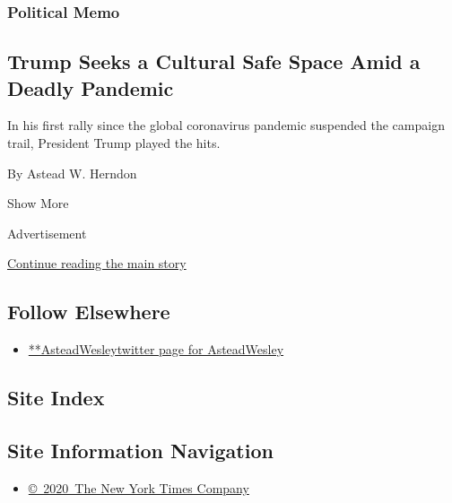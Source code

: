 \begin{enumerate}
  \hypertarget{political-memo}{%
  \subsubsection{Political Memo}\label{political-memo}}

  \hypertarget{trump-seeks-a-cultural-safe-space-amid-a-deadly-pandemic}{%
  \subsection{Trump Seeks a Cultural Safe Space Amid a Deadly
  Pandemic}\label{trump-seeks-a-cultural-safe-space-amid-a-deadly-pandemic}}

  In his first rally since the global coronavirus pandemic suspended the
  campaign trail, President Trump played the hits.

  By Astead W. Herndon
\end{enumerate}

Show More

Advertisement

\protect\hyperlink{after-mid2}{Continue reading the main story}

\hypertarget{follow-elsewhere}{%
\subsection{Follow Elsewhere}\label{follow-elsewhere}}

\begin{itemize}
\tightlist
\item
  \href{https://twitter.com/AsteadWesley}{**AsteadWesleytwitter page for
  AsteadWesley}
\end{itemize}

\hypertarget{site-index}{%
\subsection{Site Index}\label{site-index}}

\hypertarget{site-information-navigation}{%
\subsection{Site Information
Navigation}\label{site-information-navigation}}

\begin{itemize}
\tightlist
\item
  \href{https://help.nytimes.com/hc/en-us/articles/115014792127-Copyright-notice}{©~2020~The
  New York Times Company}
\end{itemize}

